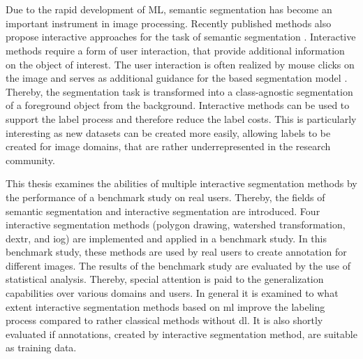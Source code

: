 \chapter{\abstractname}

Due to the rapid development of ML, semantic segmentation has become an important instrument in image processing.
Recently published methods also propose interactive approaches for the task of semantic segmentation \cite{Xu16-InteractiveObjectSelection} \cite{JG18-ClickCarving} \cite{Liew17-RegionalInteractiveImageSeg}.
Interactive methods require a form of user interaction, that provide additional information on the object of interest.
The user interaction is often realized by mouse clicks on the image and serves as additional guidance for the based segmentation model \cite{Man18-DEXTR} \cite{Zha20-IOG}. 
Thereby, the segmentation task is transformed into a class-agnostic segmentation of a foreground object from the background.
Interactive methods can be used to support the label process and therefore reduce the label costs.
This is particularly interesting as new datasets can be created more easily, allowing labels to be created for image domains, that are rather underrepresented in the research community.

This thesis examines the abilities of multiple interactive segmentation methods by the performance of a benchmark study on real users.
Thereby, the fields of semantic segmentation and interactive segmentation are introduced.
Four interactive segmentation methods (polygon drawing, watershed transformation, \gls{dextr}\cite{Man18-DEXTR}, and \gls{iog}\cite{Zha20-IOG}) are implemented and applied in a benchmark study.
In this benchmark study, these methods are used by real users to create annotation for different images.
The results of the benchmark study are evaluated by the use of statistical analysis.
Thereby, special attention is paid to the generalization capabilities over various domains and users.
In general it is examined to what extent interactive segmentation methods based on \gls{ml} improve the labeling process compared to rather classical methods without \gls{dl}.
It is also shortly evaluated if annotations, created by interactive segmentation method, are suitable as training data.
